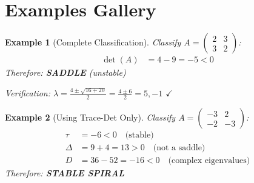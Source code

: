 \documentclass[12pt]{article}
\newtheorem{example}{Example}
\begin{document}
\section{Examples Gallery}

\begin{example}[Complete Classification]
Classify $A = \begin{pmatrix} 2 & 3 \\ 3 & 2 \end{pmatrix}$:
\begin{align}
\det(A) &= 4 - 9 = -5 < 0
\end{align}
Therefore: \textbf{SADDLE} (unstable)

Verification: $\lambda = \frac{4 \pm \sqrt{16 + 20}}{2} = \frac{4 \pm 6}{2} = 5, -1$ $\checkmark$
\end{example}

\begin{example}[Using Trace-Det Only]
Classify $A = \begin{pmatrix} -3 & 2 \\ -2 & -3 \end{pmatrix}$:
\begin{align}
\tau &= -6 < 0 \quad \text{(stable)} \\
\Delta &= 9 + 4 = 13 > 0 \quad \text{(not a saddle)} \\
D &= 36 - 52 = -16 < 0 \quad \text{(complex eigenvalues)}
\end{align}
Therefore: \textbf{STABLE SPIRAL}
\end{example}
\end{document}
